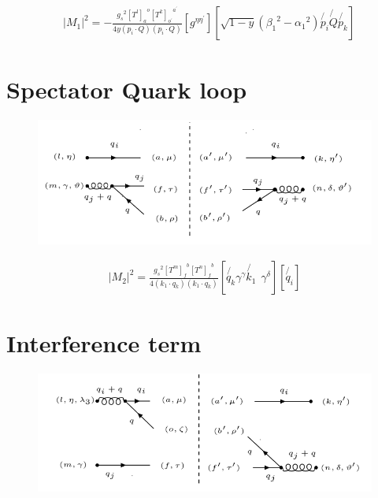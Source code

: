 \begin{equation}
\begin{split}
&|M_1|^2=-\frac{{g_s}^2 {[T^l]_a}^o {[T^k]_{o^{\prime}}}^{a^{\prime}}}{4y(p_i \cdot Q)(p_i \cdot Q) }[g^{{\eta}{{\eta}^{\prime}}}][\sqrt{1-y}({\beta_1}^2- {\alpha_1}^2) \not{p_i}\not{Q} \not{p_k}]
\end{split}
\end{equation}

\pagebreak

\section{Spectator Quark loop}
\begin{figure}[ht!]
\centering
\includegraphics[scale=0.7]{images/QG/M2Squer.png}
\end{figure}

\begin{equation}
\begin{split}
|M_2|^2=\frac{{g_s}^2 {[T^m]_f}^b {[T^n]_{f}}^{b}}{4(k_1 \cdot q_k)(k_1\cdot q_k)}[\not{q_k}{\gamma}^{\gamma}\not{k_1}\:\: {\gamma}^{{\delta}}][\not{q_i}]
\end{split}
\end{equation}

\pagebreak

\section{Interference term}
\begin{figure}[ht!]
\centering
\includegraphics[scale=0.7]{images/QG/M1M2Dagger.png}
\end{figure}



